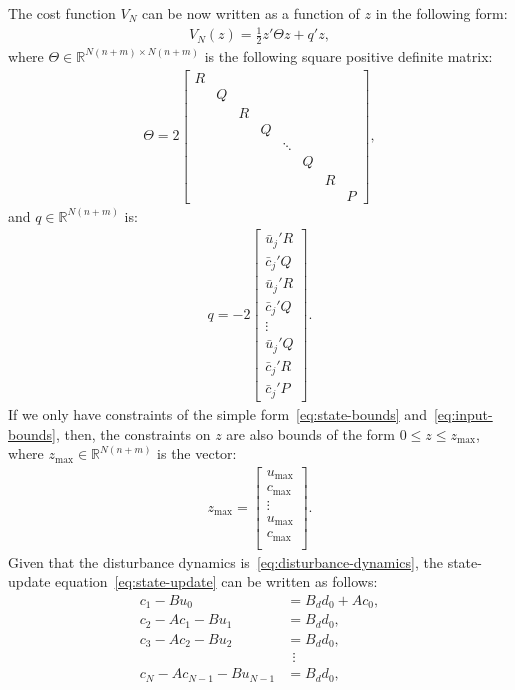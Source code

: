 \documentclass[12pt]{report}
\renewcommand{\Re}{\mathbb{R}}
\newcommand{\bcj}{\bar{c}_j}
\newcommand{\buj}{\bar{u}_j}
\begin{document}
The cost function $V_N$ can be now written as a function of $z$ in the following
form:
\begin{align}
V_N(z) = \frac{1}{2}z' \Theta z + q'z,
\end{align}
where $\Theta\in\Re^{N(n+m)\times N(n+m)}$ is the following square positive definite matrix:
\begin{align}
\Theta=2\left[
\begin{array}{cccccccc}
R\\
&Q\\
&&R\\
&&&Q\\
&&&&\ddots\\
&&&&&Q\\
&&&&&&R\\
&&&&&&&P
\end{array}\right],
\end{align}
and $q\in \Re^{N(n+m)}$ is:
\begin{align}
q=-2\left[
\begin{array}{c}
\buj' R\\
\bcj' Q\\
\buj' R\\
\bcj' Q\\
\vdots\\
\buj' Q\\
\bcj' R\\
\bcj' P
\end{array}\right].
\end{align}
If we only have constraints of the simple form~\eqref{eq:state-bounds} and~\eqref{eq:input-bounds},
then, the constraints on $z$ are also bounds of the form $0\leq z \leq z_{\max}$, where
$z_{\max}\in\Re^{N(n+m)}$ is the vector:
\begin{align}
z_{\max}=\left[
\begin{array}{c}
u_{\max}\\
c_{\max}\\
\vdots\\
u_{\max}\\
c_{\max}\\
\end{array}\right].
\end{align}
Given that the disturbance dynamics is~\eqref{eq:disturbance-dynamics}, the
state-update equation~\eqref{eq:state-update} can be written as follows:
\begin{align*}
c_1 - Bu_0 &= B_d d_0 + Ac_0,\\
c_2 - Ac_1 - Bu_1 &= B_d d_0,\\
c_3 - Ac_2 - Bu_2 &= B_d d_0,\\
&\ \ \vdots\\
c_N - Ac_{N-1}-Bu_{N-1} &= B_d d_0,
\end{align*}
\end{document}
